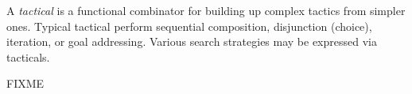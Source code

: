 \begin{isabellebody}
\begin{isamarkuptext}
\begin{description}
  \end{description}%
\end{isamarkuptext}%
\isamarkuptrue%
%
\endisatagmlref
{\isafoldmlref}%
%
\isadelimmlref
%
\endisadelimmlref
%
\isamarkuptrue%
%
\begin{isamarkuptext}%
A \emph{tactical} is a functional combinator for building up complex
  tactics from simpler ones.  Typical tactical perform sequential
  composition, disjunction (choice), iteration, or goal addressing.
  Various search strategies may be expressed via tacticals.

  \medskip FIXME%
\end{isamarkuptext}%
\isamarkuptrue%
%
\isadelimtheory
%
\endisadelimtheory
%
\isatagtheory
{}\isamarkupfalse%
%
\endisatagtheory
{\isafoldtheory}%
%
\isadelimtheory
%
\endisadelimtheory
\isanewline
\end{isabellebody}%
